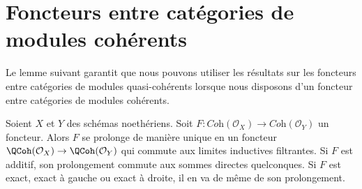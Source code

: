 \section{Foncteurs entre catégories de modules cohérents}
\label{section-functor-coherent}

\noindent
Le lemme suivant garantit que nous pouvons utiliser les résultats sur les
foncteurs entre catégories de modules quasi-cohérents lorsque nous disposons
d'un foncteur entre catégories de modules cohérents.

\begin{lemma}
\label{lemma-functor-coherent}
Soient $X$ et $Y$ des schémas noethériens. Soit
$F : \textit{Coh}(\mathcal{O}_X) \to \textit{Coh}(\mathcal{O}_Y)$
un foncteur. Alors $F$ se prolonge de manière unique en un foncteur
$\QCoh(\mathcal{O}_X) \to \QCoh(\mathcal{O}_Y)$
qui commute aux limites inductives filtrantes.
Si $F$ est additif, son prolongement commute aux sommes directes quelconques.
Si $F$ est exact, exact à gauche ou exact à droite, il en va de même de son
prolongement.
\end{lemma}

